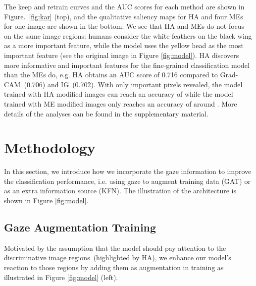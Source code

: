 \documentclass{bmvc2k}
\begin{document}
The keep and retrain curves and the AUC scores for each method are shown in Figure.\ \ref{fig:kar} (top), and the qualitative saliency maps for HA and four MEs for one image are shown in the bottom. We see that HA and MEs do not focus on the same image regions: humans consider the white feathers on the black wing as a more important feature, while the model uses the yellow head as the most important feature (see the original image in Figure \ref{fig:model}). HA discovers more informative and important features for the fine-grained classification model than the MEs do, e.g. HA obtains an AUC score of 0.716 compared to Grad-CAM~(0.706) and IG~(0.702). With only  important pixels revealed, the model trained with HA modified images can reach an accuracy of  while the model trained with ME modified images only reaches an accuracy of around . 
More details of the analyses can be found in the supplementary material.

















\section{Methodology}
In this section, we introduce how we incorporate the gaze information to improve the classification performance, i.e. using gaze to augment training data (GAT) or as an extra information source (KFN). The illustration of the architecture is shown in Figure \ref{fig:model}.


\subsection{Gaze Augmentation Training}
Motivated by the assumption that the model should pay attention to the discriminative image regions~(highlighted by HA), we enhance our model's reaction to those regions by adding them as augmentation in training as illustrated in Figure \ref{fig:model} (left).
\end{document}
